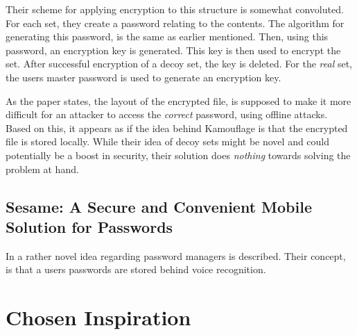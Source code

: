 			Their scheme for applying encryption to this structure is somewhat convoluted. For each set, they create a password relating to the contents. The algorithm for generating this password, is the same as earlier mentioned. Then, using this password, an encryption key is generated. This key is then used to encrypt the set. After successful encryption of a decoy set, the key is deleted. For the \emph{real} set, the users master password is used to generate an encryption key.

			As the paper states, the layout of the encrypted file, is supposed to make it more difficult for an attacker to access the \emph{correct} password, using offline attacks. Based on this, it appears as if the idea behind Kamouflage is that the encrypted file is stored locally. While their idea of decoy sets might be novel and could potentially be a boost in security, their solution does \emph{nothing} towards solving the problem at hand.

		\subsection*{Sesame: A Secure and Convenient Mobile Solution for Passwords}
			In \cite{sesame} a rather novel idea regarding password managers is described. Their concept, is that a users passwords are stored behind voice recognition.





	\section{Chosen Inspiration} 